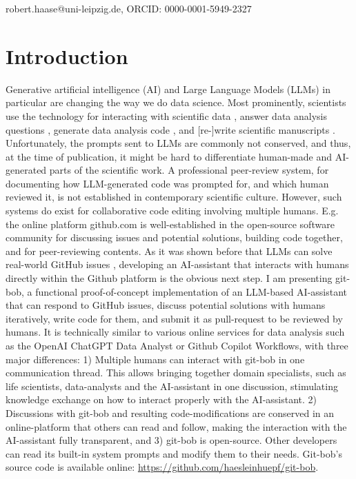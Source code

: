 \documentclass[times, twoside]{zHenriquesLab-StyleBioRxiv}
\begin{document}
\begin{corrauthor}
robert.haase@uni-leipzig.de, ORCID: 0000-0001-5949-2327
\end{corrauthor}



\section*{Introduction}

Generative artificial intelligence (AI) and Large Language Models (LLMs) in particular are changing the way we do data science. Most prominently, scientists use the technology for interacting with scientific data \cite{Royer2023}, answer data analysis questions \cite{Lai2022DS1000, lei2024bioimage}, generate data analysis code \cite{Royer2024, benchmark_llm_bia, chen2021evaluating}, and [re-]write scientific manuscripts \cite{lu2024aiscientist}. Unfortunately, the prompts sent to LLMs are commonly not conserved, and thus, at the time of publication, it might be hard to differentiate human-made and AI-generated parts of the scientific work. A professional peer-review system, for documenting how LLM-generated code was prompted for, and which human reviewed it, is not established in contemporary scientific culture. However, such systems do exist for collaborative code editing involving multiple humans. E.g. the online platform github.com is well-established in the open-source software community for discussing issues and potential solutions, building code together, and for peer-reviewing contents. As it was shown before that LLMs can solve real-world GitHub issues \cite{jimenez2024swebenchlanguagemodelsresolve}, developing an AI-assistant that interacts with humans directly within the Github platform is the obvious next step. I am presenting git-bob, a functional proof-of-concept implementation of an LLM-based AI-assistant that can respond to GitHub issues, discuss potential solutions with humans iteratively, write code for them, and submit it as pull-request to be reviewed by humans. It is technically similar to various online services for data analysis such as the OpenAI ChatGPT Data Analyst or Github Copilot Workflows, with three major differences: 1) Multiple humans can interact with git-bob in one communication thread. This allows bringing together domain specialists, such as life scientists, data-analysts and the AI-assistant in one discussion, stimulating knowledge exchange on how to interact properly with the AI-assistant. 2) Discussions with git-bob and resulting code-modifications are conserved in an online-platform that others can read and follow, making the interaction with the AI-assistant fully transparent, and 3) git-bob is open-source. Other developers can read its built-in system prompts and modify them to their needs.  Git-bob's source code is available online: \url{https://github.com/haesleinhuepf/git-bob}.
\end{document}
